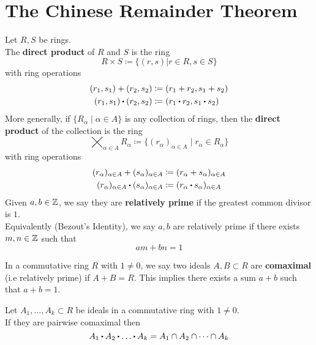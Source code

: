 \documentclass[../Main.tex]{subfiles}
\begin{document}
\chapter{The Chinese Remainder Theorem}
\begin{dfn}[title = Direct Product]
	Let $R,S$ be rings.\\
	The \textbf{direct product} of $R$ and $S$ is the ring
	\[R\times S \coloneqq \{(r,s)|r\in R, s\in S \}\]
	with ring operations
	\begin{align*}
		(r_1,s_1)+(r_2,s_2)&\coloneqq (r_1+r_2,s_1+s_2)\\
		(r_1,s_1)\rdot (r_2,s_2)&\coloneqq (r_1\rdot r_2,s_1\rdot s_2)
	\end{align*}
	More generally, if $\{R_\alpha\mid \alpha\in A\}$ is any collection of rings, then the \textbf{direct product} of the collection is the ring
	\[\bigtimes_{\alpha \in A}R_\alpha \coloneqq \{(r_\alpha)_{\alpha\in A}\mid  r_\alpha \in R_\alpha\}\]
	with ring operations
	\begin{align*}
	(r_\alpha)_{\alpha\in A}+(s_\alpha)_{\alpha\in A}&\coloneqq (r_\alpha +s_\alpha)_{\alpha\in A}\\
	(r_\alpha)_{\alpha\in A}\rdot (s_\alpha)_{\alpha\in A}&\coloneqq (r_\alpha \rdot s_\alpha)_{\alpha\in A}
	\end{align*}
	Given $a,b\in \mathbb{Z}$, we say they are \textbf{relatively prime} if the greatest common divisor is $1$.\\
	Equivalently (Bezout's Identity), we say $a,b$ are relatively prime if there exists $m,n\in\mathbb{Z}$ such that \[am+bn=1\]
\end{dfn}
\begin{dfn}[title = Comaximal Ideals]
	In a commutative ring $R$ with $1\ne 0$, we say two ideals $A,B\subset R$ are \textbf{comaximal} (i.e relatively prime) if $A+B=R$. This implies there exists a sum $a+b$ such that $a+b=1$.
\end{dfn}
\begin{thm}[title = Product of pairwise comaximals is intersection]
	Let $A_1,\dots,A_k\subset R$ be ideals in a commutative ring with $1\ne 0$.\\
	If they are pairwise comaximal then
	\[A_1\rdot A_2\rdot \dots \rdot A_k = A_1 \cap A_2 \cap \dots \cap A_k\]
\end{thm}
\end{document}
